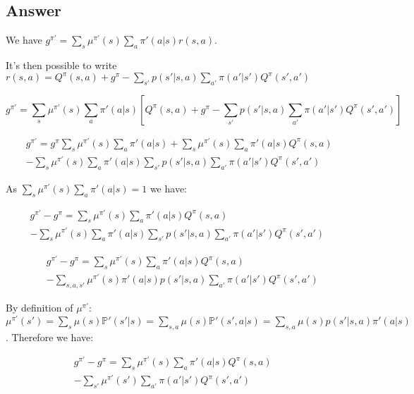 \documentclass[a4paper]{article}
\begin{document}
\subsection*{Answer}
We have $g^{\pi'} = \sum_s \mu^{\pi'}(s) \sum_a \pi'(a|s) r(s,a)$.

It's then possible to write $r(s, a) = Q^{\pi}(s,a) + g^\pi - \sum_{s'} p(s'|s,a) \sum_{a'} \pi(a'|s') Q^\pi(s', a')$

$$g^{\pi'} = \sum_s \mu^{\pi'}(s) \sum_a \pi'(a|s)[Q^{\pi}(s,a) + g^\pi - \sum_{s'} p(s'|s,a) \sum_{a'} \pi(a'|s') Q^\pi(s', a')]$$

\begin{equation*}
    \begin{split}
        g^{\pi'} = g^\pi\sum_s \mu^{\pi'}(s)\sum_a \pi'(a|s) + \sum_s \mu^{\pi'}(s) \sum_a \pi'(a|s)Q^{\pi}(s,a)\,\,\,\,\,\\
        - \sum_s \mu^{\pi'}(s) \sum_a \pi'(a|s) \sum_{s'} p(s'|s,a) \sum_{a'} \pi(a'|s') Q^\pi(s', a')
    \end{split}
\end{equation*}

As $\sum_s \mu^{\pi'}(s) \sum_a \pi'(a|s) = 1$ we have:

\begin{equation*}
    \begin{split}
        g^{\pi'} - g^\pi = \sum_s \mu^{\pi'}(s) \sum_a \pi'(a|s)Q^{\pi}(s,a)\;\;\;\;\;\;\;\;\;\;\;\;\;\;\;\;\;\;\;\;\;\;\;\;\;\;\;\;\;\;\;\;\;\;\;\;\;\;\;\,\\
        - \sum_s \mu^{\pi'}(s) \sum_a \pi'(a|s) \sum_{s'} p(s'|s,a) \sum_{a'} \pi(a'|s') Q^\pi(s', a')
    \end{split}
\end{equation*}

\begin{equation*}
    \begin{split}
        g^{\pi'} - g^\pi = \sum_s \mu^{\pi'}(s) \sum_a \pi'(a|s)Q^{\pi}(s,a)\;\;\;\;\;\;\;\;\;\;\;\;\;\;\;\;\;\;\;\;\;\;\;\;\;\;\;\,\\
        - \sum_{s, a, s'} \mu^{\pi'}(s) \pi'(a|s) p(s'|s,a) \sum_{a'} \pi(a'|s') Q^\pi(s', a')
    \end{split}
\end{equation*}

By definition of $\mu^{\pi'}$: $\mu^{\pi'}(s') = \sum_s \mu(s) \mathbb{P}'(s'|s) = \sum_{s,a} \mu(s) \mathbb{P}'(s', a|s)  = \sum_{s,a} \mu(s) p(s'|s, a) \pi'(a|s)$.
Therefore we have:

\begin{equation*}
    \begin{split}
        g^{\pi'} - g^\pi = \sum_s \mu^{\pi'}(s) \sum_a \pi'(a|s)Q^{\pi}(s,a)\;\;\;\;\;\;\;\,\\
        - \sum_{s'} \mu^{\pi'}(s') \sum_{a'} \pi(a'|s') Q^\pi(s', a')
    \end{split}
\end{equation*}
\end{document}
